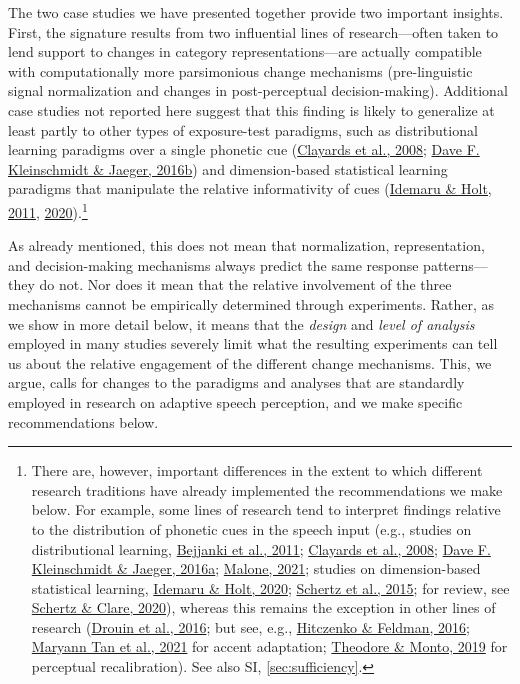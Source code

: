 \documentclass[
  11pt,
  english,
  man,floatsintext]{apa6}
\begin{document}
The two case studies we have presented together provide two important insights. First, the signature results from two influential lines of research---often taken to lend support to changes in category representations---are actually compatible with computationally more parsimonious change mechanisms (pre-linguistic signal normalization and changes in post-perceptual decision-making). Additional case studies not reported here suggest that this finding is likely to generalize at least partly to other types of exposure-test paradigms, such as distributional learning paradigms over a single phonetic cue (\protect\hyperlink{ref-clayards2008}{Clayards et al., 2008}; \protect\hyperlink{ref-kleinschmidt-jaeger2016cogsci}{Dave F. Kleinschmidt \& Jaeger, 2016b}) and dimension-based statistical learning paradigms that manipulate the relative informativity of cues (\protect\hyperlink{ref-idemaru-holt2011}{Idemaru \& Holt, 2011}, \protect\hyperlink{ref-idemaru-holt2020}{2020}).\footnote{There are, however, important differences in the extent to which different research traditions have already implemented the recommendations we make below. For example, some lines of research tend to interpret findings relative to the distribution of phonetic cues in the speech input (e.g., studies on distributional learning, \protect\hyperlink{ref-bejjanki2011}{Bejjanki et al., 2011}; \protect\hyperlink{ref-clayards2008}{Clayards et al., 2008}; \protect\hyperlink{ref-kleinschmidt-jaeger2016pbr}{Dave F. Kleinschmidt \& Jaeger, 2016a}; \protect\hyperlink{ref-malone2021}{Malone, 2021}; studies on dimension-based statistical learning, \protect\hyperlink{ref-idemaru-holt2020}{Idemaru \& Holt, 2020}; \protect\hyperlink{ref-schertz2015}{Schertz et al., 2015}; for review, see \protect\hyperlink{ref-schertz-clare2020}{Schertz \& Clare, 2020}), whereas this remains the exception in other lines of research (\protect\hyperlink{ref-drouin2016}{Drouin et al., 2016}; but see, e.g., \protect\hyperlink{ref-hitczenko-feldman2016}{Hitczenko \& Feldman, 2016}; \protect\hyperlink{ref-tan2021}{Maryann Tan et al., 2021} for accent adaptation; \protect\hyperlink{ref-theodore-monto2019}{Theodore \& Monto, 2019} for perceptual recalibration). See also SI, \ref{sec:sufficiency}.}

As already mentioned, this does not mean that normalization, representation, and decision-making mechanisms always predict the same response patterns---they do not. Nor does it mean that the relative involvement of the three mechanisms cannot be empirically determined through experiments. Rather, as we show in more detail below, it means that the \emph{design} and \emph{level of analysis} employed in many studies severely limit what the resulting experiments can tell us about the relative engagement of the different change mechanisms. This, we argue, calls for changes to the paradigms and analyses that are standardly employed in research on adaptive speech perception, and we make specific recommendations below.
\end{document}
